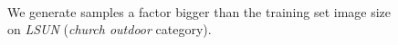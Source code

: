 \documentclass{article}
\begin{document}
\begin{figure}[H]
\vspace{0pt}
    \centering {} \\
    \caption{We generate samples a factor bigger than the training set image size on \emph{LSUN} (\emph{church outdoor} category).}
\vspace{0pt}
\end{figure}
\end{document}
